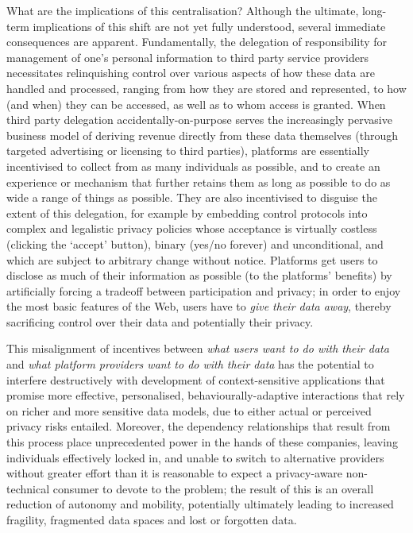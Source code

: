\documentclass[runningheads,a4paper]{llncs}
\begin{document}
What are the implications of this centralisation?  Although the ultimate, long-term implications of this shift are not yet fully understood, several immediate consequences are apparent. Fundamentally, the delegation of responsibility for management of one's personal information to third party service providers necessitates relinquishing control over various aspects of how these data are handled and processed, ranging from how they are stored and represented, to how (and when) they can be accessed, as well as to whom access is granted.  When third party delegation accidentally-on-purpose serves the increasingly pervasive business model of deriving revenue directly from these data themselves (through targeted advertising or licensing to third parties), platforms are essentially incentivised to collect from as many individuals as possible, and to create an experience or mechanism that further retains them as long as possible to do as wide a range of things as possible. They are also incentivised to disguise the extent of this delegation, for example by embedding control protocols into complex and legalistic privacy policies whose acceptance is virtually costless (clicking the `accept' button), binary (yes/no forever) and unconditional, and which are subject to arbitrary change without notice. Platforms get users to disclose as much of their information as possible (to the platforms' benefits) by artificially forcing a tradeoff between participation and privacy; in order to enjoy the most basic features of the Web, users have to \emph{give their data away}, thereby sacrificing control over their data and potentially their privacy.

This misalignment of incentives between \emph{what users want to do with their data} and \emph{what platform providers want to do with their data} has the potential to interfere destructively with development of context-sensitive applications that promise more effective, personalised, behaviourally-adaptive interactions that rely on richer and more sensitive data models, due to either actual or perceived privacy risks entailed.  Moreover, the dependency relationships that result from this process place unprecedented power in the hands of these companies, leaving individuals effectively locked in, and unable to switch to alternative providers without greater effort than it is reasonable to expect a privacy-aware non-technical consumer to devote to the problem; the result of this is an overall reduction of autonomy and mobility, potentially ultimately leading to increased fragility, fragmented data spaces and lost or forgotten data\cite{lostlegacy}.
\end{document}
